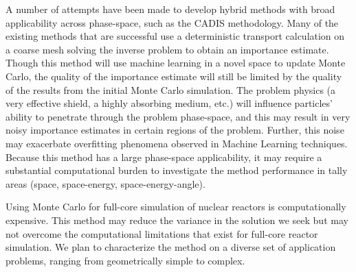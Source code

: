 \documentclass[letterpaper,12pt]{article}
\begin{document}

A number of attempts have been made to develop hybrid methods with broad
applicability across phase-space, such as the CADIS
methodology\cite{haghighat_monte_2003}. Many of the
existing methods that are successful use a deterministic transport
calculation on a coarse mesh solving the inverse problem to obtain an importance
estimate\cite{zhang_global_2014, zhang_adjoint-based_2011, haghighat_monte_2003,
hendricks_mcnp_1985}. Though this method will use machine learning in a novel space to
update Monte Carlo, the quality of the importance estimate will still be limited
by the quality of the results from the initial Monte Carlo simulation. The
problem physics (a very effective shield, a highly absorbing medium, etc.) will
influence particles' ability to penetrate through the problem phase-space, and
this may result in very noisy importance estimates in certain regions of the
problem\cite{van_wijk_easy_2011}. Further, this noise may exacerbate overfitting phenomena observed in
Machine Learning techniques. Because this method has a large phase-space
applicability, it may require a substantial computational burden to investigate
the method performance in tally areas (space, space-energy, space-energy-angle).

Using Monte Carlo for full-core simulation of nuclear reactors is
computationally expensive\cite{martin_challenges_2012}. This method may reduce
the variance in the solution we seek but may not overcome the computational
limitations that exist for full-core reactor simulation. We plan to
characterize the method on a diverse set of application problems, ranging from
geometrically simple to complex.
\end{document}
